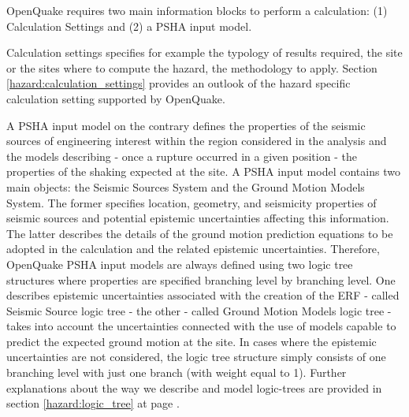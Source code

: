 %
%
OpenQuake requires two main information blocks to perform a calculation: (1) 
Calculation Settings and (2) a PSHA input model.

Calculation settings specifies for example the typology of results required,
the site or the sites where to compute the hazard, the methodology to apply.
%
Section \ref{hazard:calculation_settings} provides an outlook of the hazard 
specific calculation setting supported by OpenQuake. 

A PSHA input model on the contrary defines the properties of the seismic sources 
of engineering  interest within the region considered in the analysis and the 
models describing - once a rupture occurred in a given position - the properties 
of the shaking expected at the site. 
%
A PSHA input model contains two main objects: the Seismic Sources System and 
the Ground Motion Models System. 
%
The former specifies location, geometry, and seismicity properties of seismic 
sources and potential epistemic uncertainties affecting this information. 
%
The latter describes the details of the ground motion prediction equations to 
be adopted in the calculation and the related epistemic uncertainties. 
%
Therefore, OpenQuake PSHA input models are always defined using two logic 
tree structures where properties are specified branching level by branching 
level. One describes epistemic uncertainties associated with the creation of 
the ERF - called Seismic Source logic tree - 
the other - called Ground Motion Models logic tree - takes into account the 
uncertainties connected with the use of models capable to predict the expected 
ground motion at the site. 
% 
%
%
In cases where the epistemic uncertainties are not considered, the logic tree 
structure simply consists of one branching level with just one branch (with 
weight equal to 1).
%
Further explanations about the way we describe and model logic-trees are 
provided in section \ref{hazard:logic_tree} at page \pageref{hazard:logic_tree}. 



